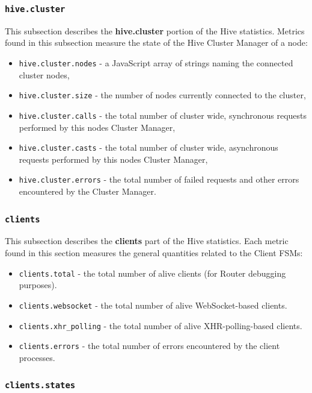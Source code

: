 \documentclass[a4paper]{article}
\begin{document}
\subsubsection{\texttt{hive.cluster}}
\label{sec-4-2-4}

This subsection describes the \textbf{hive.cluster} portion of the Hive statistics. Metrics found in this subsection measure the state of the Hive Cluster Manager of a node:


\begin{itemize}
\item \texttt{hive.cluster.nodes} - a JavaScript array of strings naming the connected cluster nodes,
\item \texttt{hive.cluster.size} - the number of nodes currently connected to the cluster,
\item \texttt{hive.cluster.calls} - the total number of cluster wide, synchronous requests performed by this nodes Cluster Manager,
\item \texttt{hive.cluster.casts} - the total number of cluster wide, asynchronous requests performed by this nodes Cluster Manager,
\item \texttt{hive.cluster.errors} - the total number of failed requests and other errors encountered by the Cluster Manager.
\end{itemize}
\subsubsection{\texttt{clients}}
\label{sec-4-2-5}

This subsection describes the \textbf{clients} part of the Hive statistics. Each metric found in this section measures the general quantities related to the Client FSMs:


\begin{itemize}
\item \texttt{clients.total} - the total number of alive clients (for Router debugging purposes).
\item \texttt{clients.websocket} - the total number of alive WebSocket-based clients.
\item \texttt{clients.xhr\_polling} - the total number of alive XHR-polling-based clients.
\item \texttt{clients.errors} - the total number of errors encountered by the client processes.
\end{itemize}
\subsubsection{\texttt{clients.states}}
\label{sec-4-2-6}
\end{document}
